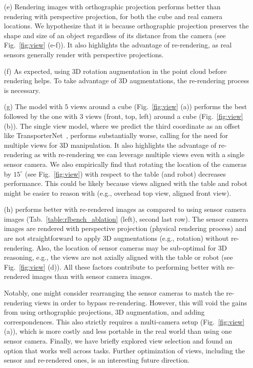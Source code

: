  (e) Rendering images with orthographic projection performs better than rendering with perspective projection, for both the cube and real camera locations. We hypothesize that it is because orthographic projection preserves the shape and size of an object regardless of its distance from the camera (see Fig.~\ref{fig:view} (e-f)). It also highlights the advantage of re-rendering, as real sensors generally render with perspective projections.

(f) As expected, using 3D rotation augmentation in the point cloud before rendering helps. To take advantage of 3D augmentations, the re-rendering process is necessary. 

(g) The model with $5$ views around a cube (Fig.~\ref{fig:view} (a)) performs the best followed by the one with $3$ views (front, top, left) around a cube (Fig.~\ref{fig:view} (b)). The single view model, where we predict the third coordinate as an offset like TransporterNet~\cite{transporter2021}, performs substantially worse, calling for the need for multiple views for 3D manipulation. It also highlights the advantage of re-rendering as with re-rendering we can leverage multiple views even with a single sensor camera. We also empirically find that rotating the location of the cameras by $15^{\circ}$ (see Fig.~\ref{fig:view}) with respect to the table (and robot) decreases performance. This could be likely because views aligned with the table and robot might be easier to reason with (e.g., overhead top view, aligned front view).

(h) \method performs better with re-rendered images as compared to using sensor camera images (Tab.~\ref{table:rlbench_ablation} (left), second last row). The sensor camera images are rendered with perspective projection (physical rendering process) and are not straightforward to apply 3D augmentations (e.g., rotation) without re-rendering. Also, the location of sensor cameras may be sub-optimal for 3D reasoning, e.g., the views are not axially aligned with the table or robot (see Fig.~\ref{fig:view} (d)). All these factors contribute to \method performing better with re-rendered images than with sensor camera images. 

Notably, one might consider rearranging the sensor cameras to match the re-rendering views in order to bypass re-rendering. However, this will void the gains from using orthographic projections, 3D augmentation, and adding correspondences. This also strictly requires a multi-camera setup (Fig.~\ref{fig:view} (a)), which is more costly and less portable in the real world than using one sensor camera. Finally, we have briefly explored view selection and found an option that works well across tasks. Further optimization of views, including the sensor and re-rendered ones, is an interesting future direction.

